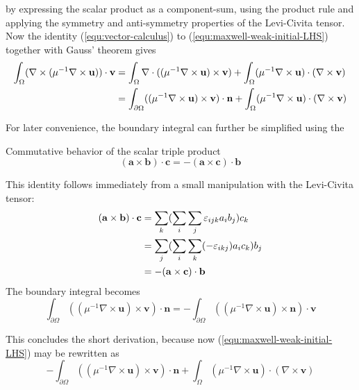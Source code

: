 \documentclass[11pt, a4paper]{article}
\begin{document}
by expressing the scalar product as a component-sum, using the product rule and
applying the symmetry and anti-symmetry properties of the Levi-Civita tensor.
Now the identity (\ref{equ:vector-calculus}) to (\ref{equ:maxwell-weak-initial-LHS})
together with Gauss' theorem gives
\begin{align}
    \int_{\Omega} (\nabla \times ({\mu^{-1} \nabla \times \mathbf{u}})) \cdot \mathbf{v} &=
    \int_{\Omega} \nabla \cdot (({\mu^{-1} \nabla \times \mathbf{u}}) \times \mathbf{v})
    + \int_{\Omega} ({\mu^{-1} \nabla \times \mathbf{u}}) \cdot (\nabla \times \mathbf{v}) \notag \\
    &= \int_{\partial \Omega} (({\mu^{-1} \nabla \times \mathbf{u}}) \times \mathbf{v}) \cdot \mathbf{n}
    + \int_{\Omega} ({\mu^{-1} \nabla \times \mathbf{u}}) \cdot (\nabla \times \mathbf{v}) \notag \\
\end{align}

For later convenience, the boundary integral can further be simplified using the
\begin{fancybox}{Commutative behavior of the scalar triple product}
    \begin{equation}
        (\mathbf{a} \times \mathbf{b}) \cdot \mathbf{c} = - (\mathbf{a} \times \mathbf{c}) \cdot \mathbf{b} \label{equ:vector-algebra}
    \end{equation}
\end{fancybox}
This identity follows immediately from a small manipulation with the Levi-Civita
tensor:
\begin{align}
    (\mathbf{a} \times \mathbf{b}) \cdot \mathbf{c} &= \sum_k (\sum_i \sum_j \varepsilon_{ijk} a_i b_j) c_k \notag \\
     &= \sum_j (\sum_i \sum_k (-\varepsilon_{ikj}) a_i c_k) b_j \notag \\ 
     &= - (\mathbf{a} \times \mathbf{c}) \cdot \mathbf{b} 
\end{align}
The boundary integral becomes 
\begin{equation}
    \int_{\partial \Omega} (({\mu^{-1} \nabla \times \mathbf{u}}) \times \mathbf{v}) \cdot \mathbf{n}
    = - \int_{\partial \Omega} (({\mu^{-1} \nabla \times \mathbf{u}}) \times \mathbf{n}) \cdot \mathbf{v}
\end{equation}

This concludes the short derivation, because now (\ref{equ:maxwell-weak-initial-LHS})
may be rewritten as
\begin{equation}
    - \int_{\partial \Omega} (({\mu^{-1} \nabla \times \mathbf{u}}) \times \mathbf{v}) \cdot \mathbf{n}
    + \int_{\Omega} ({\mu^{-1} \nabla \times \mathbf{u}}) \cdot (\nabla \times \mathbf{v})
\end{equation}

% 
\newpage

\end{document}
